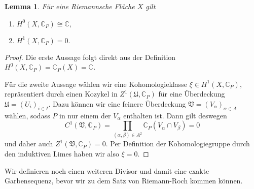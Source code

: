 \documentclass[11pt,a4paper,toc=bibliography]{scrartcl}
\theoremstyle{def}
\theoremstyle{thm}
\newtheorem{lemma}[defi]{Lemma}
\theoremstyle{remark}
\begin{document}
\begin{lemma}
Für eine Riemannsche Fläche $X$ gilt
\begin{enumerate}
    \item $H^0(X,\mathbb{C}_P)\cong \mathbb{C},$
    \item $H^1(X,\mathbb{C}_P) = 0.$ 
\end{enumerate}
    \end{lemma}
\begin{proof}
    Die erste Aussage folgt direkt aus der Definition $H^0(X,\mathbb{C}_P)=\mathbb{C}_P(X)=\mathbb{C}$.
    
    Für die zweite Aussage wählen wir eine Kohomologieklasse $\xi\in H^1(X,\mathbb{C}_P)$, repräsentiert durch einen Kozykel in $Z^1(\mathfrak{U},\mathbb{C}_P)$ für eine Überdeckung $\mathfrak{U}=(U_i)_{i\in I}$. Dazu können wir eine feinere Überdeckung $\mathfrak{V}=(V_{\alpha})_{\alpha\in A}$ wählen, sodass $P$ in nur einem der $V_{\alpha}$ enthalten ist. Dann gilt deswegen
    \[
    C^1(\mathfrak{V},\mathbb{C}_P)=\prod_{(\alpha,\beta)\in A^2} \mathbb{C}_P(V_{\alpha}\cap V_{\beta})=0
    \]
    und daher auch $Z^1(\mathfrak{V},\mathbb{C}_P)=0$. Per Definition der Kohomologiegruppe durch den induktiven Limes haben wir also $\xi = 0$.
\end{proof}
Wir definieren noch einen weiteren Divisor und damit eine exakte Garbensequenz, bevor wir zu dem Satz von Riemann-Roch kommen können.
\end{document}
